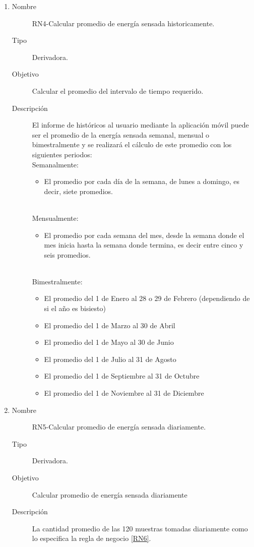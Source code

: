 \begin{enumerate}[label=RN\arabic*.]
\item \label{RN4}
		\begin{description}
			\item[Nombre] RN4-Calcular promedio de energía sensada historicamente.
			\item[Tipo] Derivadora.
			\item[Objetivo] Calcular el promedio del intervalo de tiempo requerido.
			\item[Descripción] El informe de históricos al usuario mediante la aplicación móvil puede ser el promedio de la energía sensada semanal, mensual o bimestralmente y se realizará el cálculo de este promedio con los siguientes periodos:
			\\ Semanalmente: 
			\begin{itemize}
				\item El promedio por cada día de la semana, de lunes a domingo, es decir, siete promedios.
			\end{itemize}
			\\ Mensualmente: 
			\begin{itemize}
				\item El promedio por cada semana del mes, desde la semana donde el mes inicia hasta la semana donde termina, es decir entre cinco y seis promedios.
			\end{itemize}
			\\ Bimestralmente: 
			\begin{itemize}
				\item El promedio del 1 de Enero al 28 o 29 de Febrero (dependiendo de si el año es bisiesto)
				\item El promedio del 1 de Marzo al 30 de Abril
				\item El promedio del 1 de Mayo al 30 de Junio
				\item El promedio del 1 de Julio al 31 de Agosto
				\item El promedio del 1 de Septiembre al 31 de Octubre
				\item El promedio del 1 de Noviembre al 31 de Diciembre
			\end{itemize}
		\end{description}

\item \label{RN5}
		\begin{description}
			\item[Nombre] RN5-Calcular promedio de energía sensada diariamente.
			\item[Tipo] Derivadora.
			\item[Objetivo] Calcular promedio de energía sensada diariamente
			\item[Descripción] La cantidad promedio de las 120 muestras tomadas diariamente como lo especifica la regla de negocio \ref{RN6}.
		\end{description}


\end{enumerate}
